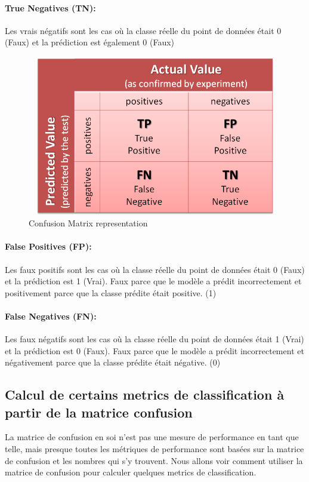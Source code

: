 \documentclass[12pt, french]{report}
\begin{document}
\paragraph*{True Negatives (TN):}
Les vrais négatifs sont les cas où la classe réelle du point de données était 0 (Faux) et la prédiction est également 0 (Faux)

\begin{figure}[h]
\includegraphics[width=14cm, height=7cm]{images/confusionmatrix.png}
\caption{Confusion Matrix representation}
\label{confusionmatrix}
\end{figure}

\paragraph*{False Positives (FP):}
Les faux positifs sont les cas où la classe réelle du point de données était 0 (Faux) et la prédiction est 1 (Vrai). Faux parce que le modèle a prédit incorrectement et positivement parce que la classe prédite était positive. (1)
\paragraph*{False Negatives (FN):}
Les faux négatifs sont les cas où la classe réelle du point de données était 1 (Vrai) et la prédiction est 0 (Faux). Faux parce que le modèle a prédit incorrectement et négativement parce que la classe prédite était négative. (0)



\subsection{Calcul de certains metrics de classification à partir de la matrice confusion}

La matrice de confusion en soi n'est pas une mesure de performance en tant que telle, mais presque toutes les métriques de performance sont basées sur la matrice de confusion et les nombres qui s'y trouvent. Nous allons voir comment utiliser la matrice de confusion pour calculer quelques metrics de classification.
\end{document}
